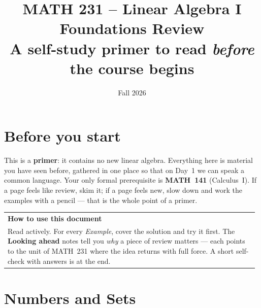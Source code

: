 \documentclass[11pt]{article}
\title{\vspace{-1.2cm}\textbf{\sffamily MATH 231 -- Linear Algebra I}\\[4pt]
       {\large\sffamily Foundations Review}\\[2pt]
       {\normalsize\sffamily A self-study primer to read \emph{before} the course begins}}
\author{}
\date{\normalsize\sffamily Fall 2026}
\makeatletter
\theoremstyle{definition}
\newcommand{\keybox}[2]{%
  \par\smallskip\noindent
  \begin{tabular}{@{}p{0.985\linewidth}@{}}
  \arrayrulecolor{RoyalBlue}\toprule
  {\sffamily\bfseries\color{RoyalBlue}#1}\\[2pt]#2\\
  \bottomrule
  \end{tabular}\par\smallskip}
\makeatother
\begin{document}
\maketitle
\vspace{-1.0cm}

\section*{Before you start}
This is a \textbf{primer}: it contains no new linear algebra. Everything
here is material you have seen before, gathered in one place so that on Day~1 we
can speak a common language. Your only formal prerequisite is \textbf{MATH~141}
(Calculus~I). If a page feels like review, skim it; if a page feels new, slow
down and work the examples with a pencil --- that is the whole point of a primer.

\keybox{How to use this document}{%
Read actively. For every \emph{Example}, cover the solution and try it first.
The \textcolor{BrickRed}{\textbf{\textsf{Looking ahead}}} notes tell you
\emph{why} a piece of review matters --- each points to the unit of MATH~231
where the idea returns with full force. A short self-check with answers is at the
end.}

\tableofcontents
\bigskip

\section{Numbers and Sets}
\end{document}
